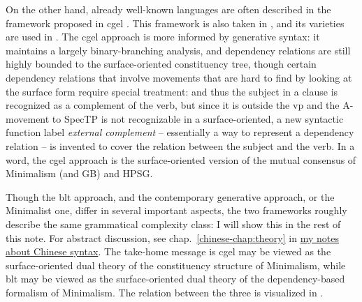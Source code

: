 \documentclass[UTF8, a4paper, oneside, scheme=plain]{ctexart}
\newcommand*{\citechap}[1]{chap.~{#1}}
\newcommand*{\term}[1]{\emph{#1}}
\newcommand{\chinesenote}{\href{../Chinese/main.pdf}{my notes about Chinese syntax}}
\begin{document}
On the other hand, already well-known languages are often described in the framework proposed in 
\ac{cgel} \citep{cgel}.
This framework is also taken in \citet{abeille2021grande,huang2016reference},
and its varieties are used in \citet{demonte1999gramatica1,munoz2000gramatica2,bosque1999gramatica3}.
The \ac{cgel} approach is more informed by generative syntax:
it maintains a largely binary-branching analysis,
and dependency relations are still highly bounded to the surface-oriented constituency tree,
though certain dependency relations that involve movements that are hard to find by looking at the surface form 
require special treatment:
and thus the subject in a clause is recognized as a complement of the verb,
but since it is outside the \ac{vp} and the A-movement to SpecTP is not recognizable
in a surface-oriented,
a new syntactic function label \term{external complement} 
-- essentially a way to represent a dependency relation --
is invented to cover the relation between the subject and the verb.
In a word, the \ac{cgel} approach
is the surface-oriented version of the mutual consensus of Minimalism (and GB) and HPSG.

Though the \ac{blt} approach, and the contemporary generative approach, or the Minimalist one,
differ in several important aspects,
the two frameworks roughly describe the same grammatical complexity class:
I will show this in the rest of this note. 
For abstract discussion, see \citechap{\ref{chinese-chap:theory}} in \chinesenote. 
The take-home message is
\ac{cgel} may be viewed as the surface-oriented dual theory of the constituency structure of Minimalism,
while \ac{blt} may be viewed as the surface-oriented dual theory of the dependency-based formalism of Minimalism.
The relation between the three is visualized in .
\end{document}

